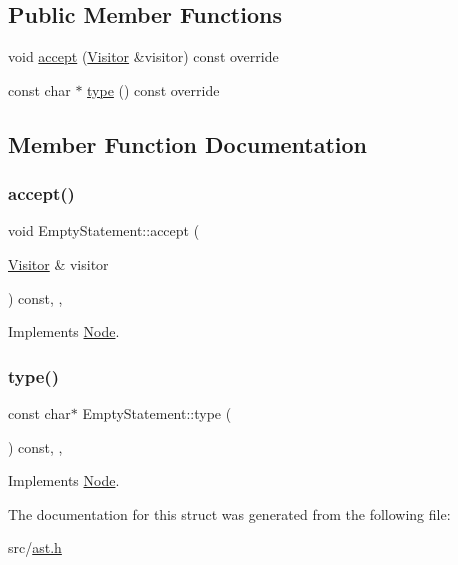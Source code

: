 \subsection*{Public Member Functions}
\begin{DoxyCompactItemize}
\item 
void \hyperlink{struct_empty_statement_af0d920224b9b982402a3a72030d49eed}{accept} (\hyperlink{struct_visitor}{Visitor} \&visitor) const override
\item 
const char $\ast$ \hyperlink{struct_empty_statement_a0401a2753b5502b252898a99a714d261}{type} () const override
\end{DoxyCompactItemize}


\subsection{Member Function Documentation}
\mbox{\label{struct_empty_statement_af0d920224b9b982402a3a72030d49eed}} 
\subsubsection{\texorpdfstring{accept()}{accept()}}
{\footnotesize\ttfamily void Empty\+Statement\+::accept (\begin{DoxyParamCaption}\item[{\hyperlink{struct_visitor}{Visitor} \&}]{visitor }\end{DoxyParamCaption}) const\hspace{0.3cm}{\ttfamily [inline]}, {\ttfamily [override]}, {\ttfamily [virtual]}}



Implements \hyperlink{struct_node_a10bd7af968140bbf5fa461298a969c71}{Node}.

\mbox{\label{struct_empty_statement_a0401a2753b5502b252898a99a714d261}} 
\subsubsection{\texorpdfstring{type()}{type()}}
{\footnotesize\ttfamily const char$\ast$ Empty\+Statement\+::type (\begin{DoxyParamCaption}{ }\end{DoxyParamCaption}) const\hspace{0.3cm}{\ttfamily [inline]}, {\ttfamily [override]}, {\ttfamily [virtual]}}



Implements \hyperlink{struct_node_a82f29420d0a38efcc370352528e94e9b}{Node}.



The documentation for this struct was generated from the following file\+:\begin{DoxyCompactItemize}
\item 
src/\hyperlink{ast_8h}{ast.\+h}\end{DoxyCompactItemize}
